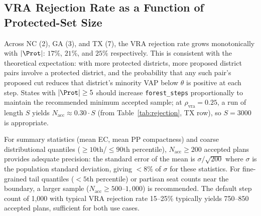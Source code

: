 \subsection{VRA Rejection Rate as a Function of Protected-Set Size}

Across NC (2), GA (3), and TX (7), the VRA rejection rate grows monotonically
with $|\Prot|$: $17\%$, $21\%$, and $25\%$ respectively.
This is consistent with the theoretical expectation: with more protected
districts, more proposed district pairs involve a protected district, and
the probability that any such pair's proposed cut reduces that district's
minority VAP below $\theta$ is positive at each step.
States with $|\Prot| \geq 5$ should increase \texttt{forest\_steps}
proportionally to maintain the recommended minimum accepted sample; at
$\rho_{\mathrm{vra}} = 0.25$, a run of length $S$ yields
$N_{\mathrm{acc}} \approx 0.30 \cdot S$ (from Table~\ref{tab:rejection},
TX row), so $S = 3000$ is appropriate.

For summary statistics (mean EC, mean PP compactness) and coarse
distributional quantiles ($\geq 10$th/$\leq 90$th percentile),
$N_{\mathrm{acc}} \geq 200$ accepted plans provides adequate precision:
the standard error of the mean is $\sigma / \sqrt{200}$ where $\sigma$
is the population standard deviation, giving $< 8\%$ of $\sigma$ for
these statistics. For fine-grained tail quantiles ($< 5$th percentile) or
partisan seat counts near the boundary, a larger sample
($N_{\mathrm{acc}} \geq 500$--$1{,}000$) is recommended. The default step
count of 1,000 with typical VRA rejection rate 15--25\% typically yields
750--850 accepted plans, sufficient for both use cases.
